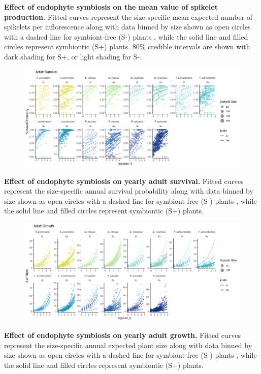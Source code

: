 \documentclass[12pt]{article}
\begin{document}
 \textbf{Effect of endophyte symbiosis on the mean value of spikelet production.} Fitted curves represent the size-specific mean expected number of spikelets per inflorescence along with data binned by size shown as open circles with a dashed line for symbiont-free (S-) plants , while the solid line and filled circles represent symbiontic (S+) plants. 80\% credible intervals are shown with dark shading for  S+, or light shading for S-.
\newpage



\begin{figure}[H]
	\centering
	\includegraphics[width=.8\linewidth]{surv_yearplot.png}
\end{figure}
 \textbf{Effect of endophyte symbiosis on yearly adult survival.} Fitted curves represent the size-specific annual survival probability along with data binned by size shown as open circles with a dashed line for symbiont-free (S-) plants , while the solid line and filled circles represent symbiontic (S+) plants. 
\begin{figure}[H]
	\centering
	\includegraphics[width=.8\linewidth]{grow_yearplot.png}
\end{figure}
 \textbf{Effect of endophyte symbiosis on yearly adult growth.} Fitted curves represent the size-specific annual expected plant size along with data binned by size shown as open circles with a dashed line for symbiont-free (S-) plants , while the solid line and filled circles represent symbiontic (S+) plants. 
\newpage
\end{document}
